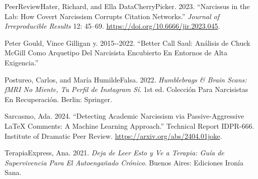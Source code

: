 \documentclass[
]{article}
\newlength{\cslhangindent}
\newenvironment{CSLReferences}[2] %
 {\begin{list}{}{%
  \setlength{\itemindent}{0pt}
  \setlength{\leftmargin}{0pt}
  \setlength{\parsep}{0pt}
  \ifodd #1
   \setlength{\leftmargin}{\cslhangindent}
   \setlength{\itemindent}{-1\cslhangindent}
  \fi
  \setlength{\itemsep}{#2\baselineskip}}}
 {\end{list}}
\begin{document}
\begin{CSLReferences}{1}{0}
PeerReviewHater, Richard, and Ella DataCherryPicker. 2023. {``Narcissus
in the Lab: How Covert Narcissism Corrupts Citation Networks.''}
\emph{Journal of Irreproducible Results} 12: 45--69.
\url{https://doi.org/10.6666/jir.2023.045}.

Peter Gould, Vince Gilligan y. 2015-\/-2022. {``Better Call Saul:
Análisis de Chuck McGill Como Arquetipo Del Narcisista Encubierto En
Entornos de Alta Exigencia.''}

Postureo, Carlos, and María HumildeFalsa. 2022. \emph{Humblebrags \&
Brain Scans: {fMRI} No Miente, Tu Perfil de Instagram Sí}. 1st ed.
Colección Para Narcisistas En Recuperación. Berlin: Springer.

Sarcasmo, Ada. 2024. {``Detecting Academic Narcissism via
Passive-Aggressive LaTeX Comments: A Machine Learning Approach.''}
Technical Report IDPR-666. Institute of Dramatic Peer Review.
\url{https://arxiv.org/abs/2404.01joke}.

TerapiaExpress, Ana. 2021. \emph{Deja de Leer Esto y Ve a Terapia: Guía
de Supervivencia Para El Autoengañado Crónico}. Buenos Aires: Ediciones
Ironía Sana.

\end{CSLReferences}
\end{document}
